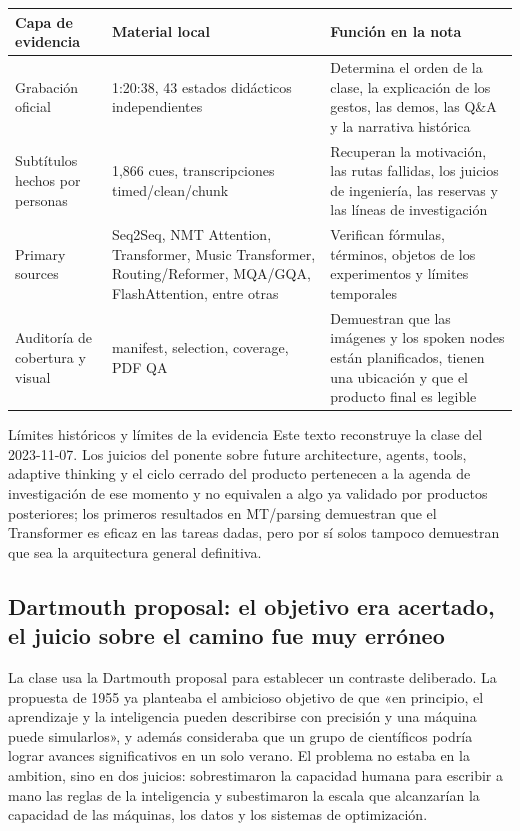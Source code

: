 \documentclass[a4paper]{article}
\begin{document}
\begin{longtable}{@{}L{0.18\textwidth}L{0.31\textwidth}L{0.40\textwidth}@{}}
\toprule
Capa de evidencia & Material local & Función en la nota \\
\midrule
Grabación oficial & 1:20:38, 43 estados didácticos independientes & Determina el orden de la clase, la explicación de los gestos, las demos, las Q\&A y la narrativa histórica \\
Subtítulos hechos por personas & 1,866 cues, transcripciones timed/clean/chunk & Recuperan la motivación, las rutas fallidas, los juicios de ingeniería, las reservas y las líneas de investigación \\
Primary sources & Seq2Seq, NMT Attention, Transformer, Music Transformer, Routing/Reformer, MQA/GQA, FlashAttention, entre otras & Verifican fórmulas, términos, objetos de los experimentos y límites temporales \\
Auditoría de cobertura y visual & manifest, selection, coverage, PDF QA & Demuestran que las imágenes y los spoken nodes están planificados, tienen una ubicación y que el producto final es legible \\
\bottomrule
\end{longtable}

\begin{warningbox}{Límites históricos y límites de la evidencia}
Este texto reconstruye la clase del 2023-11-07. Los juicios del ponente sobre future architecture, agents, tools, adaptive thinking y el ciclo cerrado del producto pertenecen a la agenda de investigación de ese momento y no equivalen a algo ya validado por productos posteriores; los primeros resultados en MT/parsing demuestran que el Transformer es eficaz en las tareas dadas, pero por sí solos tampoco demuestran que sea la arquitectura general definitiva.
\end{warningbox}

\subsection{Dartmouth proposal: el objetivo era acertado, el juicio sobre el camino fue muy erróneo}

La clase usa la Dartmouth proposal para establecer un contraste deliberado. La propuesta de 1955 ya planteaba el ambicioso objetivo de que «en principio, el aprendizaje y la inteligencia pueden describirse con precisión y una máquina puede simularlos», y además consideraba que un grupo de científicos podría lograr avances significativos en un solo verano. El problema no estaba en la ambition, sino en dos juicios: sobrestimaron la capacidad humana para escribir a mano las reglas de la inteligencia y subestimaron la escala que alcanzarían la capacidad de las máquinas, los datos y los sistemas de optimización.
\end{document}
